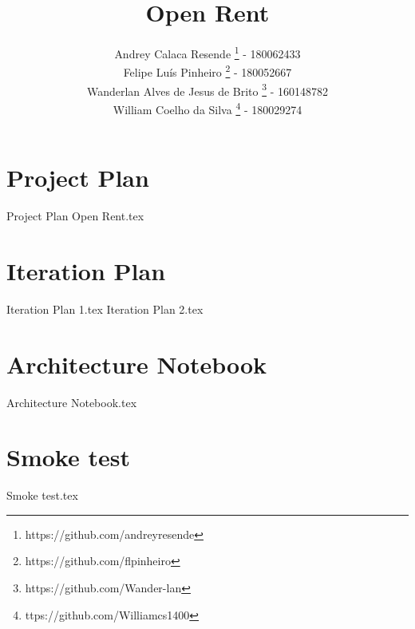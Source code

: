 \documentclass[a4paper,11pt]{book}
\title{Open Rent}
\author{
    Andrey Calaca Resende \footnote{https://github.com/andreyresende} - 180062433\\
    Felipe Luís Pinheiro \footnote{https://github.com/flpinheiro} - 180052667 \\
    Wanderlan Alves de Jesus de Brito \footnote{https://github.com/Wander-lan} - 160148782\\
    William Coelho da Silva \footnote{ttps://github.com/Williamcs1400} - 180029274

}
\date{}
\begin{document}
\maketitle

\tableofcontents

\chapter{Project Plan}
{Project Plan Open Rent.tex}

\chapter{Iteration Plan}
{Iteration Plan 1.tex}
{Iteration Plan 2.tex}

\chapter{Architecture Notebook}
{Architecture Notebook.tex}

\chapter{Smoke test}
{Smoke test.tex}
\end{document}
